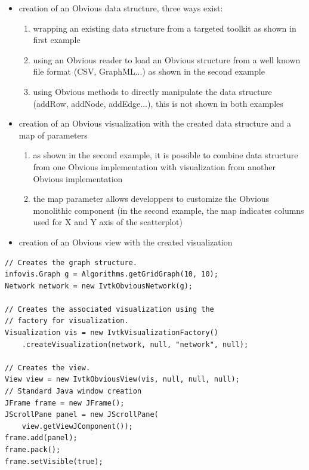 \begin{itemize}
 \item creation of an Obvious data structure, three ways exist:
 \begin{enumerate}
  \item wrapping an existing data structure from a targeted toolkit as shown in first example
  \item using an Obvious reader to load an Obvious structure from a well known file format (CSV, GraphML...) as shown in the second example
  \item using Obvious methods to directly manipulate the data structure (addRow, addNode, addEdge...), this is not shown in both examples 
 \end{enumerate}
 \item creation of an Obvious visualization with the created data structure and a map of parameters
 \begin{enumerate}
  \item as shown in the second example, it is possible to combine data structure from one Obvious implementation with visualization from another Obvious implementation
  \item the map parameter allows developpers to customize the Obvious monolithic component (in the second example, the map indicates columns used for X and Y axis of the scatterplot)
 \end{enumerate}
 \item creation of an Obvious view with the created visualization
\end{itemize} 

\begin{lstlisting}
// Creates the graph structure.
infovis.Graph g = Algorithms.getGridGraph(10, 10);
Network network = new IvtkObviousNetwork(g);

// Creates the associated visualization using the
// factory for visualization.
Visualization vis = new IvtkVisualizationFactory()
    .createVisualization(network, null, "network", null);

// Creates the view.
View view = new IvtkObviousView(vis, null, null, null);
// Standard Java window creation
JFrame frame = new JFrame();
JScrollPane panel = new JScrollPane(
    view.getViewJComponent());
frame.add(panel);
frame.pack();
frame.setVisible(true);
\end{lstlisting}

